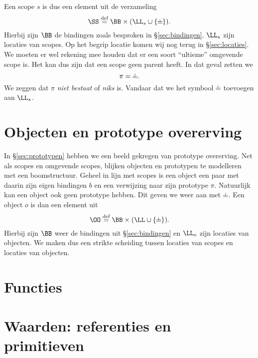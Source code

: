 Een scope $s$ is dus een element uit de verzameling
\begin{equation*}
  \SS \DEF \BB \times (\LL_s \cup \{\nil\}).
\end{equation*}
Hierbij zijn $\BB$ de bindingen zoals besproken in §\ref{sec:bindingen}. $\LL_s$ zijn locaties van scopes. Op het begrip locatie komen wij nog terug in §\ref{sec:locaties}. We moeten er wel rekening mee houden dat er een soort ``ultieme'' omgevende scope is. Het kan dus zijn dat een scope geen parent heeft. In dat geval zetten we
\begin{equation*}
  \pi = \nil.
\end{equation*}
We zeggen dat $\pi$ \emph{niet bestaat} of \emph{niks} is. Vandaar dat we het symbool $\nil$ toevoegen aan $\LL_s$.

\section{Objecten en prototype overerving}

In §\ref{sec:prototypen} hebben we een beeld gekregen van prototype overerving. Net als scopes en omgevende scopes, blijken objecten en prototypen te modelleren met een boomstructuur. Geheel in lijn met scopes is een object een paar met daarin zijn eigen bindingen $b$ en een verwijzing naar zijn prototype $\pi$. Natuurlijk kan een object ook geen prototype hebben. Dit geven we weer aan met $\nil$. Een object $o$ is dan een element uit
\begin{equation*}
  \OO \DEF \BB \times (\LL \cup \{\nil\}).
\end{equation*}
Hierbij zijn $\BB$ weer de bindingen uit §\ref{sec:bindingen} en $\LL_o$ zijn locaties van objecten. We maken dus een strikte scheiding tussen locaties van scopes en locaties van objecten.

\section{Functies}

\section{Waarden: referenties en primitieven}
\label{sec:waarden}

